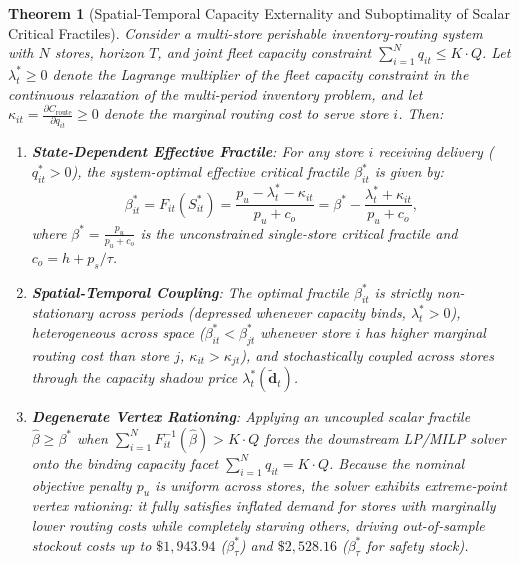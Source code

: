 \documentclass[11pt,a4paper]{article}
\newtheorem{theorem}{Theorem}
\theoremstyle{definition}
\theoremstyle{remark}
\begin{document}
\begin{itemize}[leftmargin=*]
    \begin{theorem}[Spatial-Temporal Capacity Externality and Suboptimality of Scalar Critical Fractiles]
    \label{thm:capacity_externality}
    Consider a multi-store perishable inventory-routing system with $N$ stores, horizon $T$, and joint fleet capacity constraint $\sum_{i=1}^N q_{it} \le K \cdot Q$. Let $\lambda_t^* \ge 0$ denote the Lagrange multiplier of the fleet capacity constraint in the continuous relaxation of the multi-period inventory problem, and let $\kappa_{it} = \frac{\partial C_{\text{route}}}{\partial q_{it}} \ge 0$ denote the marginal routing cost to serve store $i$. 
    Then:
    \begin{enumerate}[label=(\roman*)]
        \item \textbf{State-Dependent Effective Fractile}: For any store $i$ receiving delivery ($q_{it}^* > 0$), the system-optimal effective critical fractile $\beta_{it}^*$ is given by:
        \begin{equation}
            \beta_{it}^* = F_{it}(S_{it}^*) = \frac{p_u - \lambda_t^* - \kappa_{it}}{p_u + c_o} = \beta^* - \frac{\lambda_t^* + \kappa_{it}}{p_u + c_o},
            \label{eq:coupled_fractile}
        \end{equation}
        where $\beta^* = \frac{p_u}{p_u + c_o}$ is the unconstrained single-store critical fractile and $c_o = h + p_s/\tau$.
        \item \textbf{Spatial-Temporal Coupling}: The optimal fractile $\beta_{it}^*$ is strictly non-stationary across periods (depressed whenever capacity binds, $\lambda_t^* > 0$), heterogeneous across space ($\beta_{it}^* < \beta_{jt}^*$ whenever store $i$ has higher marginal routing cost than store $j$, $\kappa_{it} > \kappa_{jt}$), and stochastically coupled across stores through the capacity shadow price $\lambda_t^*(\tilde{\mathbf{d}}_t)$.
        \item \textbf{Degenerate Vertex Rationing}: Applying an uncoupled scalar fractile $\hat{\beta} \ge \beta^*$ when $\sum_{i=1}^N F_{it}^{-1}(\hat{\beta}) > K \cdot Q$ forces the downstream LP/MILP solver onto the binding capacity facet $\sum_{i=1}^N q_{it} = K \cdot Q$. Because the nominal objective penalty $p_u$ is uniform across stores, the solver exhibits extreme-point vertex rationing: it fully satisfies inflated demand for stores with marginally lower routing costs while completely starving others, driving out-of-sample stockout costs up to $\$1,943.94$ ($\beta_\tau^*$) and $\$2,528.16$ ($\beta_\tau^*$ for safety stock).
    \end{enumerate}
    \end{theorem}


\end{itemize}
\end{document}
